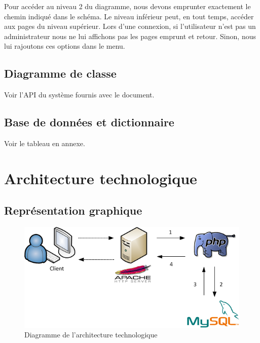 \documentclass[letter, 11pt]{report}
\begin{document}
Pour accéder au niveau 2 du diagramme, nous devons emprunter exactement le chemin indiqué dans le schéma. Le niveau inférieur peut, en tout temps, accéder aux pages du niveau supérieur. Lors d'une connexion, si l'utilisateur n'est pas un administrateur nous ne lui affichons pas les pages emprunt et retour. Sinon, nous lui rajoutons ces options dans le menu.

\section{Diagramme de classe}

Voir l'API du système fournis avec le document.

\section{Base de données et dictionnaire}

Voir le tableau en annexe.

\chapter{Architecture technologique}

\section{Représentation graphique}

\begin{figure}[htbp]
	\begin{center}
		\includegraphics[scale=0.75]{architectureTechnologique.png}
	\end{center}
	\caption{Diagramme de l'architecture technologique}
\end{figure}
\end{document}
